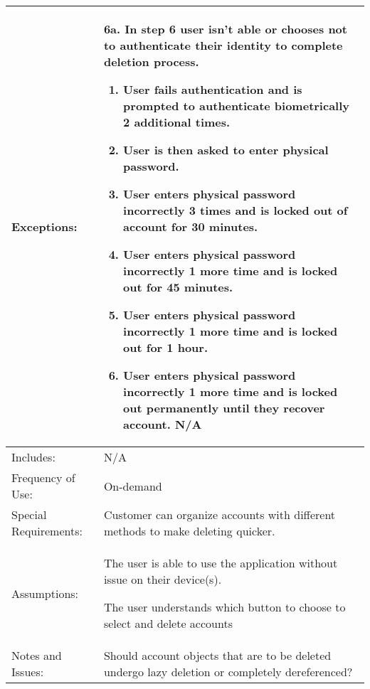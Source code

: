 \documentclass[stu]{apa7}
\newcommand{\nextitem}{\par\hspace*{\labelsep}\textbullet\hspace*{\labelsep}}
\newcommand{\nextitemblank}{\par\hspace*{\labelsep}\hspace*{\labelsep}}
\begin{document}
{\begin{xltabular}{\textwidth}{|l|X|}
  Exceptions: & 
    \nextitemblank 6a. In step 6 user isn't able or chooses not to authenticate their identity to complete deletion process.
      \begin{enumerate}
      \item User fails authentication and is prompted to authenticate biometrically 2 additional times.
      \item User is then asked to enter physical password.
      \item User enters physical password incorrectly 3 times and is locked out of account for 30 minutes.
      \item User enters physical password incorrectly 1 more time and is locked out for 45 minutes.
      \item User enters physical password incorrectly 1 more time and is locked out for 1 hour.
      \item User enters physical password incorrectly 1 more time and is locked out permanently until they recover account. N/A 
      \end{enumerate} \\ \hline
  Includes: & N/A \\ \hline

  Frequency of Use: & On-demand \\ \hline

  Special Requirements: & \nextitem Customer can organize accounts with different methods to make deleting quicker. \\ \hline

  Assumptions: & \nextitem The user is able to use the application without issue on their device(s). \nextitem The user understands which button to choose to select and delete accounts \\ \hline

  Notes and Issues: & \nextitem Should account objects that are to be deleted undergo lazy deletion or completely dereferenced? \\ \hline

\end{xltabular}}
\end{document}
